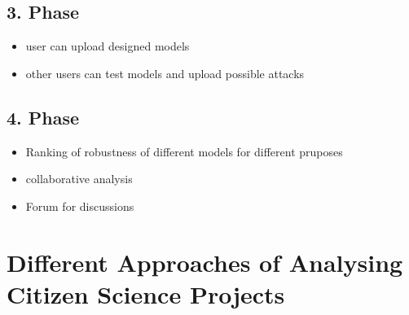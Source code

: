 \subsection{3. Phase}

\begin{itemize}
    \item user can upload designed models
    \item other users can test models and upload possible attacks
\end{itemize}

\subsection{4. Phase}

\begin{itemize}
    \item Ranking of robustness of different models for different pruposes
    \item collaborative analysis
    \item Forum for discussions 
\end{itemize}

\section{Different Approaches of Analysing Citizen Science Projects}

